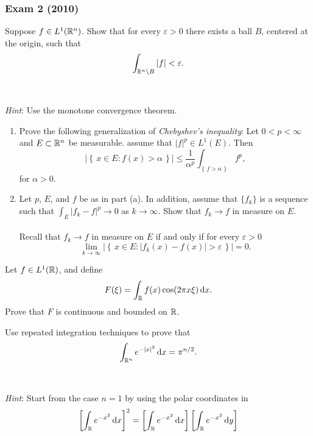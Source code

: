 \subsubsection{Exam 2 (2010)}
\setcounter{exercise}{0}
\setcounter{equation}{0}

\begin{problem}
Suppose $f\in L^1(\mathbb{R}^n)$. Show that for every $\varepsilon>0$ there
exists a ball $B$, centered at the origin, such that
\[
\int_{\mathbb{R}^n\setminus B}|f|<\varepsilon.
\]
\\\\
\emph{Hint}: Use the monotone convergence theorem.
\end{problem}
\begin{solution}
\end{solution}
\begin{problem}
\begin{enumerate}[label=(\alph*),noitemsep]
\item Prove the following generalization of \emph{Chebyshev's inequality}:
  Let $0<p<\infty$ and $E\subset\mathbb{R}^n$ be measurable. assume that
  $|f|^p\in L^1(E)$. Then
\[
\left|\left\{\,x\in E:f( x )>\alpha\,\right\}\right|
\leq\frac{1}{\alpha^p}\int_{\left\{\,f>\alpha\,\right\}}f^p,
\]
for $\alpha>0$.
\item Let $p$, $E$, and $f$ be as in part (a). In addition, assume that
  $\{f_k\}$ is a sequence such that $\int_E|f_k-f|^p\to 0$ as
  $k\to\infty$. Show that $f_k\to f$ in measure on $E$.
\\\\
Recall that $f_k\to f$ in measure on $E$ if and only if for every
$\varepsilon>0$
\[
\lim_{k\to\infty}\left|\left\{\, x \in
    E:|f_k( x )-f( x )|>\varepsilon\,\right\}\right|=0.
\]
\end{enumerate}
\end{problem}
\begin{solution}
\end{solution}

\begin{problem}
Let $f\in L^1(\mathbb{R})$, and define
\[
F(\xi)=\int_{\mathbb{R}} f(x)\cos(2\pi x\xi)\mathop{}\!\mathrm{d} x.
\]
Prove that $F$ is continuous and bounded on $\mathbb{R}$.
\end{problem}
\begin{solution}
\end{solution}

\begin{problem}
Use repeated integration techniques to prove that
\[
\int_{\mathbb{R}^n} e^{-| x |^2}\mathop{}\!\mathrm{d} x=\pi^{n/2}.
\]
\\\\
\emph{Hint}: Start from the case $n=1$ by using the polar coordinates in
\[
  \left[\int_{\bbR} e^{-x^2}\diff x\right]^2=%
  \left[\int_{\bbR} e^{-x^2}\diff x\right]%
  \left[\int_{\bbR} e^{-x^2}\diff y\right]%
\]
\end{problem}
\begin{solution}
\end{solution}

\begin{problem}
\end{problem}
\begin{solution}
\end{solution}


